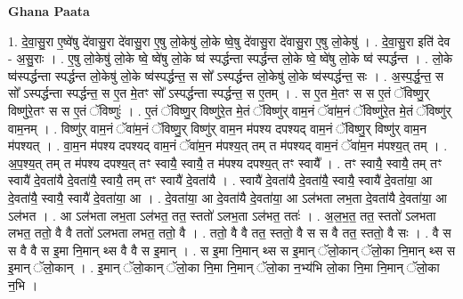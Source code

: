 \documentclass[17pt]{extarticle}
\begin{document}
\textbf{Ghana Paata } \newline

1. दे॒वा॒सु॒रा ए॒ष्वे॑षु दे॑वासु॒रा दे॑वासु॒रा ए॒षु लो॒केषु॑ लो॒के ष्वे॒षु दे॑वासु॒रा दे॑वासु॒रा ए॒षु लो॒केषु॑ । . दे॒वा॒सु॒रा इति॑ देव - अ॒सु॒राः । . ए॒षु लो॒केषु॑ लो॒के ष्वे॒ ष्वे॑षु लो॒के ष्व॑ स्पर्द्धन्ता स्पर्द्धन्त लो॒के ष्वे॒ ष्वे॑षु लो॒के ष्व॑ स्पर्द्धन्त । . लो॒के ष्व॑स्पर्द्धन्ता स्पर्द्धन्त लो॒केषु॑ लो॒के ष्व॑स्पर्द्धन्त॒ स सो᳚ ऽस्पर्द्धन्त लो॒केषु॑ लो॒के ष्व॑स्पर्द्धन्त॒ सः । . अ॒स्प॒र्द्ध॒न्त॒ स सो᳚ ऽस्पर्द्धन्ता स्पर्द्धन्त॒ स ए॒त मे॒तꣳ सो᳚ ऽस्पर्द्धन्ता स्पर्द्धन्त॒ स ए॒तम् । . स ए॒त मे॒तꣳ स स ए॒तं ॅविष्णु॒र् विष्णु॑रे॒तꣳ स स ए॒तं ॅविष्णुः॑ । . ए॒तं ॅविष्णु॒र् विष्णु॑रे॒त मे॒तं ॅविष्णु॑र् वाम॒नं ॅवा॑म॒नं ॅविष्णु॑रे॒त मे॒तं ॅविष्णु॑र् वाम॒नम् । . विष्णु॑र् वाम॒नं ॅवा॑म॒नं ॅविष्णु॒र् विष्णु॑र् वाम॒न म॑पश्य दपश्यद् वाम॒नं ॅविष्णु॒र् विष्णु॑र् वाम॒न म॑पश्यत् । . वा॒म॒न म॑पश्य दपश्यद् वाम॒नं ॅवा॑म॒न म॑पश्य॒त् तम् त म॑पश्यद् वाम॒नं ॅवा॑म॒न म॑पश्य॒त् तम् । . अ॒प॒श्य॒त् तम् त म॑पश्य दपश्य॒त् तꣳ स्वायै॒ स्वायै॒ त म॑पश्य दपश्य॒त् तꣳ स्वायै᳚ । . तꣳ स्वायै॒ स्वायै॒ तम् तꣳ स्वायै॑ दे॒वता॑यै दे॒वता॑यै॒ स्वायै॒ तम् तꣳ स्वायै॑ दे॒वता॑यै । . स्वायै॑ दे॒वता॑यै दे॒वता॑यै॒ स्वायै॒ स्वायै॑ दे॒वता॑या॒ आ दे॒वता॑यै॒ स्वायै॒ स्वायै॑ दे॒वता॑या॒ आ । . दे॒वता॑या॒ आ दे॒वता॑यै दे॒वता॑या॒ आ ऽल॑भता लभ॒ता दे॒वता॑यै दे॒वता॑या॒ आ ऽल॑भत । . आ ऽल॑भता लभ॒ता ऽल॑भत॒ तत॒ स्ततो॑ ऽलभ॒ता ऽल॑भत॒ ततः॑ । . अ॒ल॒भ॒त॒ तत॒ स्ततो॑ ऽलभता लभत॒ ततो॒ वै वै ततो॑ ऽलभता लभत॒ ततो॒ वै । . ततो॒ वै वै तत॒ स्ततो॒ वै स स वै तत॒ स्ततो॒ वै सः । . वै स स वै वै स इ॒मा नि॒मान् थ्स वै वै स इ॒मान् । . स इ॒मा नि॒मान् थ्स स इ॒मान् ॅलो॒कान् ॅलो॒का नि॒मान् थ्स स इ॒मान् ॅलो॒कान् । . इ॒मान् ॅलो॒कान् ॅलो॒का नि॒मा नि॒मान् ॅलो॒का न॒भ्य॑भि लो॒का नि॒मा नि॒मान् ॅलो॒का न॒भि । \newline
\end{document}
